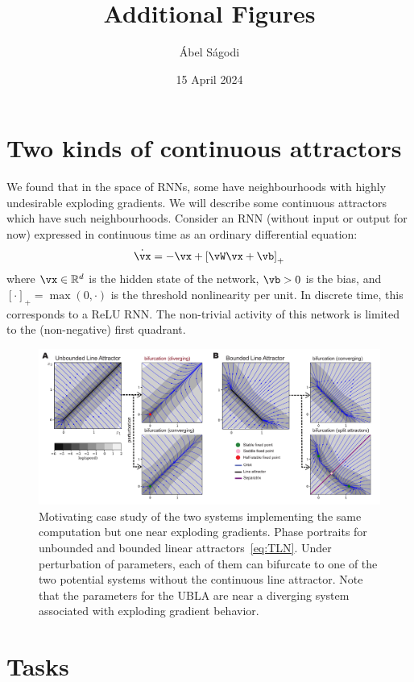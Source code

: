 \documentclass{article}
\title{Additional Figures}
\author{\'Abel S\'agodi}
\date{15 April 2024}
\newcommand{\reals}{\mathbb{R}}
\newcounter{ct}
\theoremstyle{definition}
\theoremstyle{remark}
\begin{document}
\maketitle

\section{Two kinds of continuous attractors}
We found that in the space of RNNs, some have neighbourhoods with highly undesirable exploding gradients. We will describe some continuous attractors which have such neighbourhoods.
Consider an RNN (without input or output for now) expressed in continuous time as an ordinary differential equation:
\begin{align}\label{eq:TLN}
    \dot{\vx} = -\vx + \left[ \vW \vx + \vb \right]_{+}
\end{align}
where $\vx \in \reals^d$ is the hidden state of the network, $\vb > 0$ is the bias, and $[\cdot]_{+} = \max(0,\cdot)$ is the threshold nonlinearity per unit.
In discrete time, this corresponds to a ReLU RNN.
The non-trivial activity of this network is limited to the (non-negative) first quadrant.
\begin{figure}[tbhp]
  \centering
  \includegraphics[width=\textwidth]{UBLABLA}
  \caption{Motivating case study of the two systems implementing the same computation but one near exploding gradients.
    Phase portraits for unbounded and bounded linear attractors~\eqref{eq:TLN}.
    Under perturbation of parameters, each of them can bifurcate to one of the two potential systems without the continuous line attractor.
    Note that the parameters for the UBLA are near a diverging system associated with exploding gradient behavior.
}
  \label{fig:ublabla}
\end{figure}


\newpage
\section{Tasks}
\end{document}
